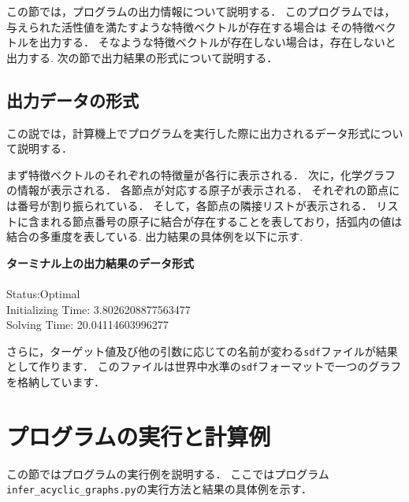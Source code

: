 \documentclass[11pt, titlepage, dvipdfmx, twoside]{article}
\begin{document}
この節では，プログラムの出力情報について説明する．
このプログラムでは，与えられた活性値を満たすような特徴ベクトルが存在する場合は
その特徴ベクトルを出力する．
そなような特徴ベクトルが存在しない場合は，存在しないと出力する.
次の節で出力結果の形式について説明する．

\subsection{出力データの形式}
\label{sec:section3_4}

この説では，計算機上でプログラムを実行した際に出力されるデータ形式について説明する．


まず特徴ベクトルのそれぞれの特徴量が各行に表示される．
次に，化学グラフの情報が表示される．
各節点が対応する原子が表示される．
それぞれの節点には番号が割り振られている．
そして，各節点の隣接リストが表示される．
リストに含まれる節点番号の原子に結合が存在することを表しており，括弧内の値は結合の多重度を表している.
出力結果の具体例を以下に示す.

\bigskip

\begin{oframed}
{\bf ターミナル上の出力結果のデータ形式}\\\\
Status:Optimal \\ 
Initializing Time: 3.8026208877563477 \\ 
Solving Time: 20.04114603996277

\end{oframed}

さらに，ターゲット値及び他の引数に応じての名前が変わる{\tt sdf}ファイルが結果として作ります．
このファイルは世界中水準の{\tt sdf}フォーマットで一つのグラフを格納しています．



\section{プログラムの実行と計算例}
\label{sec:Exp}

この節ではプログラムの実行例を説明する．
ここではプログラム{\tt infer\_acyclic\_graphs.py}の実行方法と結果の具体例を示す．

 
\end{document}
